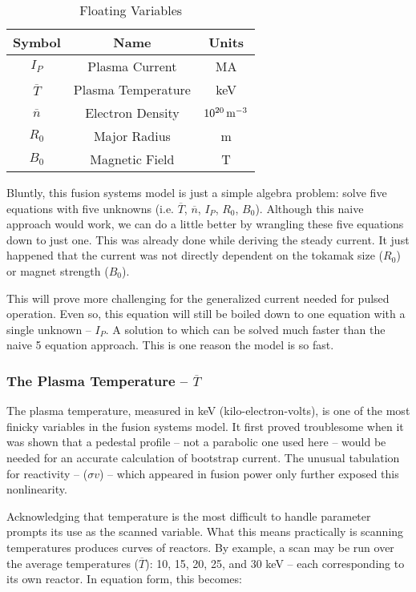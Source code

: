 \begin{table}[h!]
\centering	
\caption{Floating Variables}
\begin{tabular}{ c|c|c } 

\textbf{Symbol} & \textbf{Name} & \textbf{Units} \\
\hline
$I_P$ & Plasma Current & MA \\ 
$\overline{T}$ & Plasma Temperature & keV \\ 
$\overline{n}$ & Electron Density & $10^{20} \, \textnormal{m}^{-3}$ \\ 
$R_0$ &  Major Radius & m \\ 
$B_0$ &  Magnetic Field & T \\ 

\end{tabular}
\end{table}

Bluntly, this fusion systems model is just a simple algebra problem: solve five equations with five unknowns (i.e. $\overline T$, $\overline n$, $I_P$, $R_0$, $B_0$). Although this naive approach would work, we can do a little better by wrangling these five equations down to just one. This was already done while deriving the steady current. It just happened that the current was not directly dependent on the tokamak size ($R_0$) or magnet strength ($B_0$). 

This will prove more challenging for the generalized current needed for pulsed operation. Even so, this equation will still be boiled down to one equation with a single unknown -- $I_P$. A solution to which can be solved much faster than the naive 5 equation approach. This is one reason the model is so fast. 

\subsubsection{The Plasma Temperature -- $\overline T$}

The plasma temperature, measured in keV (kilo-electron-volts), is one of the most finicky variables in the fusion systems model. It first proved troublesome when it was shown that a pedestal profile -- not a parabolic one used here -- would be needed for an accurate calculation of bootstrap current. The unusual tabulation for reactivity -- ($\sigma v$) -- which appeared in fusion power only further exposed this nonlinearity.

Acknowledging that temperature is the most difficult to handle parameter prompts its use as the scanned variable. What this means practically is scanning temperatures produces curves of reactors. By example, a scan may be run over the average temperatures ($\overline T$): 10, 15, 20, 25, and 30 keV -- each corresponding to its own reactor. In equation form, this becomes:

